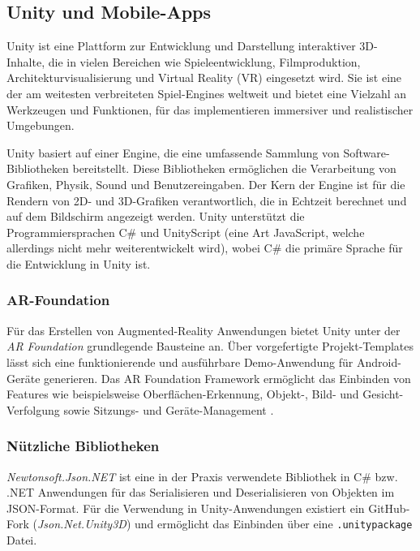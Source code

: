 \subsection{Unity und Mobile-Apps}

Unity ist eine Plattform zur Entwicklung und Darstellung interaktiver 3D-Inhalte, die in vielen Bereichen wie Spieleentwicklung, Filmproduktion, Architekturvisualisierung und Virtual Reality (VR) eingesetzt wird. Sie ist eine der am weitesten verbreiteten Spiel-Engines weltweit und bietet eine Vielzahl an Werkzeugen und Funktionen, für das implementieren immersiver und realistischer Umgebungen.

Unity basiert auf einer Engine, die eine umfassende Sammlung von Software-Bibliotheken bereitstellt. Diese Bibliotheken ermöglichen die Verarbeitung von Grafiken, Physik, Sound und Benutzereingaben. Der Kern der Engine ist für die Rendern von 2D- und 3D-Grafiken verantwortlich, die in Echtzeit berechnet und auf dem Bildschirm angezeigt werden. Unity unterstützt die Programmiersprachen C\# und UnityScript (eine Art JavaScript, welche allerdings nicht mehr weiterentwickelt wird), wobei C\#  die primäre Sprache für die Entwicklung in Unity ist.

\subsubsection{AR-Foundation}

Für das Erstellen von Augmented-Reality Anwendungen bietet Unity unter der \textit{AR Foundation} grundlegende Bausteine an. Über vorgefertigte Projekt-Templates lässt sich eine funktionierende und ausführbare Demo-Anwendung für Android-Geräte generieren. Das AR Foundation Framework ermöglicht das Einbinden von Features wie beispielsweise Oberflächen-Erkennung, Objekt-, Bild- und Gesicht-Verfolgung sowie Sitzungs- und Geräte-Management \autocite{Unity2024}.

\subsubsection{Nützliche Bibliotheken}

\textit{Newtonsoft.Json.NET} ist eine in der Praxis verwendete Bibliothek in C\# bzw. .NET Anwendungen für das Serialisieren und Deserialisieren von Objekten im JSON-Format. Für die Verwendung in Unity-Anwendungen existiert ein GitHub-Fork (\textit{Json.Net.Unity3D}) und ermöglicht das Einbinden über eine \lstinline{.unitypackage} Datei. \autocite{SaladLab2024}


